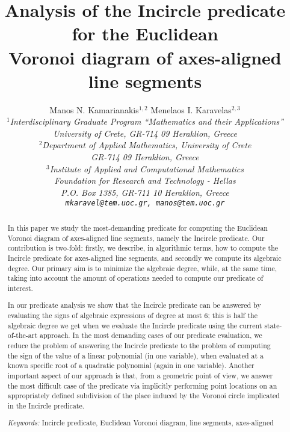 \documentclass[letterpaper,11pt]{article}
\newcommand{\sep}{,\xspace}
\newcommand{\incircle}{\textsf{Incircle}\xspace}
\begin{document}
\title{Analysis of the \textsf{Incircle} predicate for the Euclidean\\
  Voronoi diagram of axes-aligned line segments}




\author{Manos N. Kamarianakis$^{1,2}$\hfil{}
Menelaos I. Karavelas$^{2,3}$\\[5pt]
\it{}$^1$Interdisciplinary Graduate Program
\it{}``Mathematics and their Applications''\\
\it{}University of Crete,
\it{}GR-714 09 Heraklion, Greece\\[5pt]
\it{}$^2$Department of Applied Mathematics,
\it{}University of Crete\\
\it{}GR-714 09 Heraklion, Greece\\[5pt]
\it{}$^3$Institute of Applied and Computational Mathematics\\
\it{}Foundation for Research and Technology - Hellas\\
\it{}P.O. Box 1385, GR-711 10 Heraklion, Greece\\[5pt]
{\texttt{mkaravel@tem.uoc.gr, manos@tem.uoc.gr}}\\[10pt]}



\maketitle

\begin{abstract}
  In this paper we study the most-demanding predicate for computing
the Euclidean Voronoi diagram of axes-aligned line segments, namely
the \textsf{Incircle} predicate. Our contribution
is two-fold: firstly, we describe, in algorithmic terms, how to
compute the \textsf{Incircle} predicate for axes-aligned line
segments, and  secondly we compute its algebraic degree.
Our primary aim is to minimize the algebraic degree, while, at the
same time, taking into account the amount of operations needed to
compute our predicate of interest.

In our predicate analysis we show that the \textsf{Incircle}
predicate can be answered by evaluating the signs of algebraic
expressions of degree at most 6; this is half the algebraic degree
we get when we evaluate the \textsf{Incircle} predicate using the
current state-of-the-art approach. In the most demanding cases
of our predicate evaluation, we reduce the problem of answering the
\textsf{Incircle} predicate to the problem of computing the sign of
the value of a linear polynomial (in one variable), when evaluated
at a known specific root of a quadratic polynomial (again in one
variable). Another important aspect of our approach is that, from a
geometric point of view, we answer the most difficult case of the
predicate via implicitly performing point locations on an
appropriately defined subdivision of the place induced by the
Voronoi circle implicated in the \textsf{Incircle} predicate.
 
  \bigskip\noindent
  \textit{Key\;words:}\/
  \incircle predicate\sep Euclidean Voronoi diagram\sep
  line segments\sep axes-aligned
\end{abstract}
\end{document}
